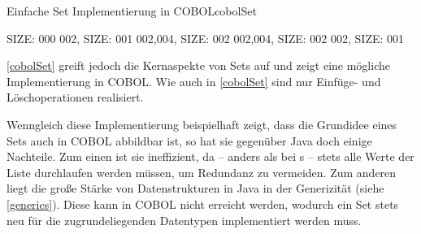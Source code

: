 \begin{codeWithCaption}{Einfache Set Implementierung in COBOL}{cobolSet}
\begin{shellwindow}
 SIZE: 000
002, SIZE: 001
002,004, SIZE: 002
002,004, SIZE: 002
002, SIZE: 001
\end{shellwindow}
\end{codeWithCaption}

\autoref{cobolSet} greift jedoch die Kernaspekte von Sets auf und zeigt eine mögliche Implementierung in COBOL. Wie auch in \autoref{cobolSet} sind nur Einfüge- und Löschoperationen realisiert. 

Wenngleich diese Implementierung beispielhaft zeigt, dass die Grundidee eines Sets auch in COBOL abbildbar ist, so hat sie gegenüber Java doch einige Nachteile. Zum einen ist sie ineffizient, da -- anders als \zB bei s -- stets alle Werte der Liste durchlaufen werden müssen, um Redundanz zu vermeiden. Zum anderen liegt die große Stärke von Datenstrukturen in Java in der Generizität (siehe \autoref{generics}). Diese kann in COBOL nicht erreicht werden, wodurch ein Set stets neu für die zugrundeliegenden Datentypen implementiert werden muss.